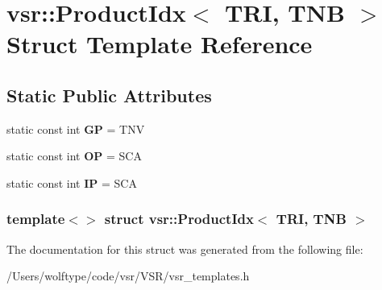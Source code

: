 \hypertarget{structvsr_1_1_product_idx_3_01_t_r_i_00_01_t_n_b_01_4}{\section{vsr\-:\-:Product\-Idx$<$ T\-R\-I, T\-N\-B $>$ Struct Template Reference}
\label{structvsr_1_1_product_idx_3_01_t_r_i_00_01_t_n_b_01_4}
}
\subsection*{Static Public Attributes}
\begin{DoxyCompactItemize}
\item 
\hypertarget{structvsr_1_1_product_idx_3_01_t_r_i_00_01_t_n_b_01_4_a8fa300768eed4fa4eede7983a8be635c}{static const int {\bfseries G\-P} = T\-N\-V}\label{structvsr_1_1_product_idx_3_01_t_r_i_00_01_t_n_b_01_4_a8fa300768eed4fa4eede7983a8be635c}

\item 
\hypertarget{structvsr_1_1_product_idx_3_01_t_r_i_00_01_t_n_b_01_4_a27acb8bdb397f416e7f37d1dbb763993}{static const int {\bfseries O\-P} = S\-C\-A}\label{structvsr_1_1_product_idx_3_01_t_r_i_00_01_t_n_b_01_4_a27acb8bdb397f416e7f37d1dbb763993}

\item 
\hypertarget{structvsr_1_1_product_idx_3_01_t_r_i_00_01_t_n_b_01_4_a6e27c2eafcffe1681aed98c1f6bbf365}{static const int {\bfseries I\-P} = S\-C\-A}\label{structvsr_1_1_product_idx_3_01_t_r_i_00_01_t_n_b_01_4_a6e27c2eafcffe1681aed98c1f6bbf365}

\end{DoxyCompactItemize}
\subsubsection*{template$<$$>$ struct vsr\-::\-Product\-Idx$<$ T\-R\-I, T\-N\-B $>$}



The documentation for this struct was generated from the following file\-:\begin{DoxyCompactItemize}
\item 
/\-Users/wolftype/code/vsr/\-V\-S\-R/vsr\-\_\-templates.\-h\end{DoxyCompactItemize}

